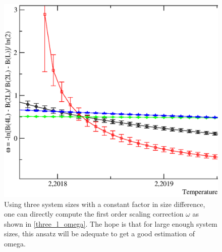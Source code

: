 %
\begin{figure}[!htpb]
  \centering
  \label{fig:three_l_omega}
  \includegraphics[width=\textwidth]{./plots/3DXY/vsO/three_L_BinderCumuland.eps}
  \caption{Using three system sizes with a constant factor in size difference, one can directly compute the first order scaling correction $\omega$ as shown in \ref{three_l_omega}. The hope is that for large enough system sizes, this ansatz will be adequate to get a good estimation of omega.}
\end{figure}

